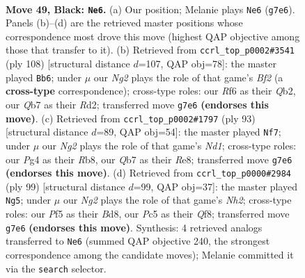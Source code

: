 \documentclass[11pt]{article}
\begin{document}
\clearpage

\begin{figure}[p]\centering
\begin{subfigure}{0.46\textwidth}\centering
\resizebox{\linewidth}{!}{%
\newchessgame
\chessboard[
  setfen={nr4k1/1q4n1/p2b1r2/P1p2p1p/3p1Pp1/1P4P1/QRNBP2P/2RN2K1 b - - 15 49},
  showmover=false,
  pgfstyle=straightmove, color=movearrow, markmove={g7-e6}
]}
\caption{}
\end{subfigure}\hfill
\begin{subfigure}{0.46\textwidth}\centering
\resizebox{\linewidth}{!}{%
\newchessgame
\chessboard[
  setfen={r1r1q1k1/2nbbpp1/3p3p/1p2p3/1P2P2P/P1N2PP1/1QRR1B1K/5B2 w - - 3 55},
  showmover=false,
  pgfstyle=straightmove, color=movearrow, markmove={f2-b6}
]}
\caption{}
\end{subfigure}
\\[4pt]
\begin{subfigure}{0.46\textwidth}\centering
\resizebox{\linewidth}{!}{%
\newchessgame
\chessboard[
  setfen={1r1nr1k1/p2b4/P1p2qp1/2Pp1p1p/1p3P2/1P1BPN1P/4R1P1/2R1Q2K b - - 24 47},
  showmover=false,
  pgfstyle=straightmove, color=movearrow, markmove={d8-f7}
]}
\caption{}
\end{subfigure}\hfill
\begin{subfigure}{0.46\textwidth}\centering
\resizebox{\linewidth}{!}{%
\newchessgame
\chessboard[
  setfen={r2b1qk1/r6n/Pp1p2n1/2pPp3/R1P1PpP1/R6N/K2BB2P/3Q4 b - - 2 50},
  showmover=false,
  pgfstyle=straightmove, color=movearrow, markmove={h7-g5}
]}
\caption{}
\end{subfigure}
\caption{\textbf{Move 49, Black: \texttt{Ne6}.} (a) Our position; Melanie plays \texttt{Ne6} (\texttt{g7e6}). Panels (b)--(d) are the retrieved master positions whose correspondence most drove this move (highest QAP objective among those that transfer to it). (b) Retrieved from \texttt{ccrl\_top\_p0002\#3541} (ply 108) [structural distance $d$=107, QAP obj=78]: the master played \texttt{Bb6}; under $\mu$ our \emph{Ng2} plays the role of that game's \emph{Bf2} (a \textbf{cross-type} correspondence); cross-type roles: our \emph{R}f6 as their \emph{Q}b2, our \emph{Q}b7 as their \emph{R}d2; transferred move \texttt{g7e6} \textbf{(endorses this move)}. (c) Retrieved from \texttt{ccrl\_top\_p0002\#1797} (ply 93) [structural distance $d$=89, QAP obj=54]: the master played \texttt{Nf7}; under $\mu$ our \emph{Ng2} plays the role of that game's \emph{Nd1}; cross-type roles: our \emph{P}g4 as their \emph{R}b8, our \emph{Q}b7 as their \emph{R}e8; transferred move \texttt{g7e6} \textbf{(endorses this move)}. (d) Retrieved from \texttt{ccrl\_top\_p0000\#2984} (ply 99) [structural distance $d$=99, QAP obj=37]: the master played \texttt{Ng5}; under $\mu$ our \emph{Ng2} plays the role of that game's \emph{Nh2}; cross-type roles: our \emph{P}f5 as their \emph{B}d8, our \emph{P}c5 as their \emph{Q}f8; transferred move \texttt{g7e6} \textbf{(endorses this move)}. Synthesis: 4 retrieved analogs transferred to \texttt{Ne6} (summed QAP objective 240, the strongest correspondence among the candidate moves); Melanie committed it via the \texttt{search} selector.}
\label{fig:thought-m97}
\end{figure}
\end{document}
